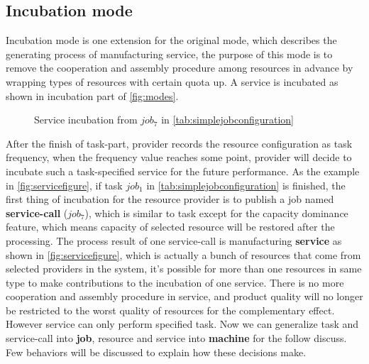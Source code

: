 \subsection{Incubation mode} %
\label{sub:incubation_mode}
Incubation mode is one extension for the original mode, which describes the generating process of  manufacturing service, the purpose of this mode is to remove the cooperation and assembly procedure among resources in advance by wrapping types of resources with certain quota up. A service is incubated as shown in incubation part of \autoref{fig:modes}.
\begin{figure}[htbp]
    \centering
    \scriptsize
    \resizebox{.65\textwidth}{!}{}
    \caption{Service incubation from $job_7$ in \autoref{tab:simplejobconfiguration}}
    \label{fig:servicefigure}
\end{figure}
After the finish of task-part, provider records the resource configuration as task frequency, when the frequency value reaches some point, provider will decide to incubate such a task-specified service for the future performance. As the example in \autoref{fig:servicefigure}, if task $job_1$ in \autoref{tab:simplejobconfiguration} is finished, the first thing of incubation for the resource provider is to publish a job named \textbf{service-call} ($job_7$), which is similar to task except for the capacity dominance feature, which means capacity of selected resource will be restored after the processing. The process result of one service-call is manufacturing \textbf{service} as shown in \autoref{fig:servicefigure}, which is actually a bunch of resources that come from selected providers in the system, it's possible for more than one resources in same type to make contributions to the incubation of one service. There is no more cooperation and assembly procedure in service, and product quality will no longer be restricted to the worst quality of resources for the complementary effect. However service can only perform specified task.
Now we can generalize task and service-call into \textbf{job}, resource and service into \textbf{machine} for the follow discuss. Few behaviors will be discussed to explain how these decisions make.

